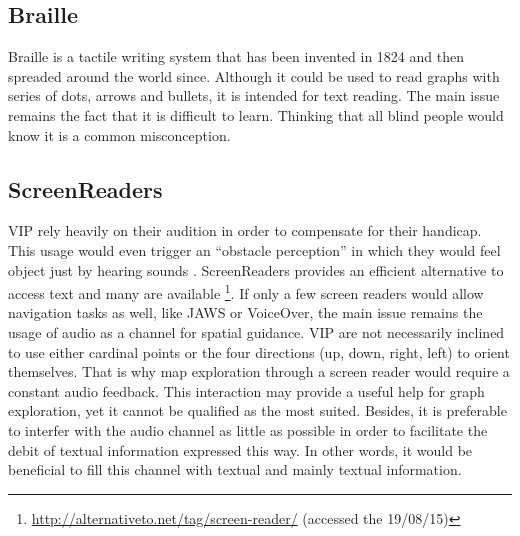 \subsection{Braille}\label{braille}

Braille is a tactile writing system that has been invented in 1824 and
then spreaded around the world since. Although it could be used to read
graphs with series of dots, arrows and bullets, it is intended for text
reading. The main issue remains the fact that it is difficult to learn.
Thinking that all blind people would know it is a common misconception.

\subsection{ScreenReaders}\label{screenreaders}

VIP rely heavily on their audition in order to compensate for their
handicap. This usage would even trigger an ``obstacle perception'' in
which they would feel object just by hearing sounds \cite{levesqueblindness}.
ScreenReaders provides an efficient alternative to access text and many
are available \footnote{\url{http://alternativeto.net/tag/screen-reader/}
  (accessed the 19/08/15)}. If only a few screen readers would allow
navigation tasks as well, like JAWS\cite{JAWS} or VoiceOver\cite{voiceOver}, the main issue remains
the usage of audio as a channel for spatial guidance. VIP are not
necessarily inclined to use either cardinal points or the four
directions (up, down, right, left) to orient themselves. That is why map
exploration through a screen reader would require a constant audio
feedback. This interaction may provide a useful help for graph
exploration, yet it cannot be qualified as the most suited. Besides, it
is preferable to interfer with the audio channel as little as possible
in order to facilitate the debit of textual information expressed this
way. In other words, it would be beneficial to fill this channel with
textual and mainly textual information.


